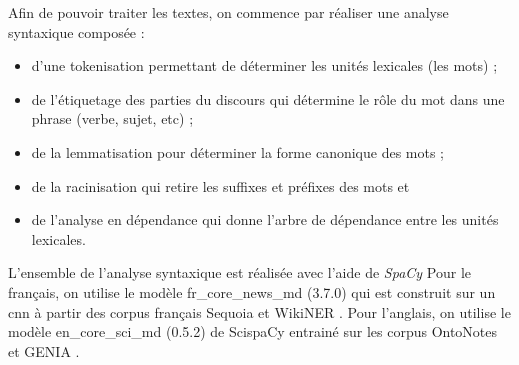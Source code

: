 Afin de pouvoir traiter les textes, on commence par réaliser une analyse syntaxique composée :
\begin{itemize}
    \item d'une tokenisation permettant de déterminer les unités lexicales (les mots) ;
    \item de l'étiquetage des parties du discours qui détermine le rôle du mot dans une phrase (verbe, sujet, etc) ;
    \item de la lemmatisation pour déterminer la forme canonique des mots ;
    \item de la racinisation qui retire les suffixes et préfixes des mots et
    \item de l'analyse en dépendance qui donne l'arbre de dépendance entre les unités lexicales.
\end{itemize}

L'ensemble de l'analyse syntaxique est réalisée avec l'aide de \emph{SpaCy} \cite{SpaCy101Everything,honnibalSpaCyIndustrialstrengthNatural2020,patelAppliedNaturalLanguage2021}
Pour le français, on utilise le modèle \textsf{fr\_core\_news\_md} (3.7.0) qui est construit sur un \gls{cnn} \cite{honnibalSpacyNaturalLanguage2017} à partir des corpus français Sequoia \cite{canditoCorpusSequoiaAnnotation2012,barqueDeepSequoiaCorpus2020} et WikiNER \cite{nothmanLearningMultilingualNamed2013,LearningMultilingualNamed2017}.
Pour l'anglais, on utilise le modèle \textsf{en\_core\_sci\_md} (0.5.2) de ScispaCy \cite{neumannScispaCyFastRobust2019,AllenaiScispacy2020} entrainé sur les corpus OntoNotes \cite{weischedelOntoNotesLargeTraining2011,weischedelralphOntoNotesRelease2013} et GENIA \cite{kimGENIACorpusSemantically2003,mccloskySelfTrainingBiomedicalParsing2008}.
